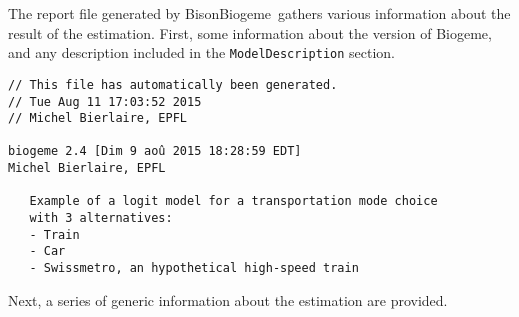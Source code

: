 \documentclass[12pt,a4paper]{article}
\newcommand{\BBIOGEME}{BisonBiogeme}
\begin{document}
The report file generated by \BBIOGEME\ gathers various information
about the result of the estimation. First, some information about the
version of Biogeme, and any description included in the
\lstinline$ModelDescription$ section. 


\begin{lstlisting}[style=tiny]
// This file has automatically been generated.
// Tue Aug 11 17:03:52 2015
// Michel Bierlaire, EPFL

biogeme 2.4 [Dim 9 aoû 2015 18:28:59 EDT]
Michel Bierlaire, EPFL

   Example of a logit model for a transportation mode choice
   with 3 alternatives:
   - Train
   - Car
   - Swissmetro, an hypothetical high-speed train
\end{lstlisting}

Next, a series of generic information about the estimation are provided. 
\end{document}
